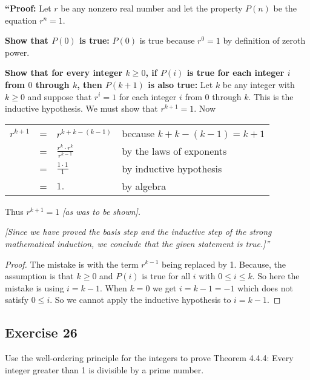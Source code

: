 \documentclass[14pt]{extarticle}
\newcommand{\dps}{\displaystyle}
\newcommand{\cy}{\color{cyan}}
\begin{document}
    {\bf “Proof:} Let $r$ be any nonzero real number and let the property $P(n)$ be the equation $r^n = 1$.

    {\bf Show that $P(0)$ is true:} $P(0)$ is true because $r^0 = 1$ by definition of zeroth power.

    {\bf Show that for every integer $k \geq 0$, if $P(i)$ is true for each integer $i$ from $0$ through $k$, then $P(k + 1)$ is also true:} Let $k$ be any integer with $k \geq 0$ and suppose that $r^i = 1$ for each integer $i$ from $0$ through $k$. This is the inductive hypothesis. We must show that $r^{k+1} = 1$. Now

\begin{center}
    \begin{tabular}{rcll}
        $\dps r^{k+1}$ & = & $\dps r^{k + k - (k - 1)}$           & {\cy because $k + k - (k - 1) = k+1$} \\
        \vspace{0.3cm}
                       & = & $\dps \frac{r^k \cdot r^k}{r^{k-1}}$ & {\cy by the laws of exponents}        \\
                       & = & $\dps \frac{1 \cdot 1}{1}$           & {\cy by inductive hypothesis}         \\
                       & = & $\dps 1.$                            & {\cy by algebra}
    \end{tabular}
\end{center}

Thus $r^{k+1} = 1$ {\it [as was to be shown].}

    {\it [Since we have proved the basis step and the inductive
            step of the strong mathematical induction, we conclude that the given statement is true.]”}

\begin{proof}
    The mistake is with the term $r^{k-1}$ being replaced by 1. Because, the assumption is that $k \geq 0$ and $P(i)$ is true for all $i$ with $0 \leq i \leq k$. So here the mistake is using $i = k-1$. When $k = 0$ we get $i = k - 1 = -1$ which does not satisfy $0 \leq i$. So we cannot apply the inductive hypothesis to $i = k-1$.
\end{proof}

\subsection{Exercise 26}
Use the well-ordering principle for the integers to prove Theorem 4.4.4: Every integer greater than 1 is divisible by a prime number.
\end{document}
